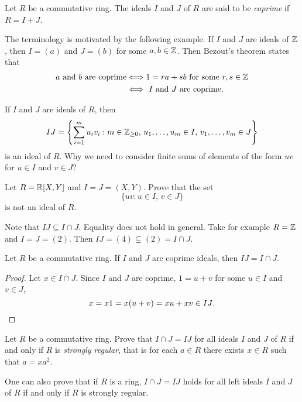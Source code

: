 \begin{definition}
	Let $R$ be a commutative ring. The ideals $I$ and $J$ of $R$ are said to be
	\emph{coprime} if $R=I+J$.  
\end{definition}

The terminology is motivated by the following example. If $I$ and $J$ are
ideals of $\mathbb{Z}$, then $I=(a)$ and $J=(b)$ for some $a,b\in\mathbb{Z}$. Then Bezout's theorem 
states that 
\begin{align*}
\text{$a$ and $b$ are coprime}
&\Longleftrightarrow 1=ra+sb\text{ for some $r,s\in\mathbb{Z}$}\\
&\Longleftrightarrow\text{ $I$ and $J$ are coprime.}
\end{align*}

If $I$ and $J$ are ideals of $R$, then 
\[
	IJ=\left\{\sum_{i=1}^mu_iv_i:m\in\mathbb{Z}_{\geq0},\,u_1,\dots,u_m\in I,\,v_1,\dots,v_m\in J\right\}
\]
is an ideal of $R$. 
Why we need to consider finite sums of elements of the form $uv$
for $u\in I$ and $v\in J$?

\begin{exercise}
    \label{xca:IJ}
    Let $R=\mathbb{R}[X,Y]$ and $I=J=(X,Y)$. Prove that the
    set \[
    \{uv:u\in I,\,v\in J\}
    \]
    is not an ideal of $R$.
\end{exercise}

Note that $IJ\subseteq I\cap J$. Equality does not hold in general. Take
for example $R=\mathbb{Z}$ and $I=J=(2)$. Then $IJ=(4)\subsetneq (2)=I\cap J$. 

\begin{proposition}
Let $R$ be a commutative ring. If $I$ and $J$ are coprime ideals, then $IJ=I\cap J$. 	
\end{proposition}

\begin{proof}
Let $x\in I\cap J$. Since $I$ and $J$ are coprime, 
$1=u+v$ for some $u\in I$ and $v\in J$, 
\[ 
x=x1=x(u+v)=xu+xv\in IJ\qedhere.
\]
\end{proof}

\begin{bonus}
\label{xca:strongly_regular}
    Let $R$ be a commutative ring. 
    Prove that $I\cap J=IJ$ 
    for all ideals $I$ and $J$ of $R$
    if and only if $R$ is \emph{strongly regular}, 
    that is  
    for each $a\in R$ there 
    exists $x\in R$ such that $a=xa^2$. 
\end{bonus}

One can also prove that if $R$ is a ring,
$I\cap J=IJ$ holds 
for all left ideals $I$ and $J$ of $R$ 
if and only if $R$ is strongly regular. 


